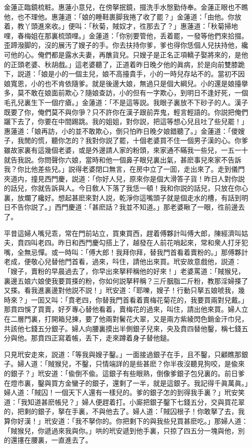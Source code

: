 金蓮正臨鏡梳粧。惠蓮小意兒，在傍拏抿鏡，掇洗手水慇勤侍奉。金蓮正眼也不瞧他，也不理他。惠蓮道：「娘的睡鞋裹脚我捲了收了罷？」金蓮道：「由他。你放着，教丫頭進來收。」便叫：「秋菊，賊奴才，徃那去了？」惠蓮道：「秋菊掃地哩，春梅姐在那裏梳頭哩。」金蓮道：「你别要管他，丢着罷，一發等他們來拾掇。歪蹄潑脚的，沒的展汚了嫂子的手。你去扶持你爹，爹也得你恁個人兒扶持他，纔可他的心。俺們都是露水夫妻，再醮貨兒。只嫂子是正名正項轎子娶將來的，是他的正頭老婆、秋胡戲。」這老婆聽了，正道着昨日晚夕他的眞病，於是向前雙膝跪下，説道：「娘是小的一個主兒，娘不高擡貴手，小的一時兒存站不的。當初不因娘寬恩，小的也不肯依隨爹。就是後邊大娘，無過只是個大綱兒。小的還是娘擡擧多，莫不敢在娘面前欺心？隨娘查訪，小的但有一字欺心，到明日不逢好死，一個毛孔兒裏生下一個疔瘡。」金蓮道：「不是這等説。我眼子裏放不下砂子的人。漢子既要了你，俺們莫不與你爭？只不許你在漢子跟前弄鬼，輕言輕語的。你説把俺們躧下去了，你要在中間踢跳。我的姐姐，對你説，把這等想心兒且吐了些兒罷！」惠蓮道：「娘再訪，小的並不敢欺心，倒只怕昨日晚夕娘錯聽了。」金蓮道：「儍嫂子，我閒的慌，聽你怎的？我對你説了罷，十個老婆買不住一個男子漢的心。你爹雖故家裏有這幾個老婆，或是外邊請人家的粉頭，來家通不瞞我一些兒，一五一十就告我説。你問聲你六娘，當時和他一個鼻子眼兒裏出氣，甚麽事兒來家不告訴我？你比他差些兒。」説得老婆閉口無言，在房中立了一囬，走出來了。走到儀門夾道内，撞見西門慶，説道：「你好人兒，原來你是個大滑答子貨！昨日人對你説的話兒，你就告訴與人。今日敎人下落了我恁一頓！我和你説的話兒，只放在你心裏，放爛了纔好。想起甚麽來對人説，乾淨你這嘴頭子就是個走水的槽，有話到明日不告你説了。」西門慶道：「甚麽話？我並不知道。」那老婆瞅了一眼，徃前邊去了。

平昔這婦人嘴兒乖，常在門前站立，買東買西，趕着傅夥計叫傅大郎，陳經濟叫姑夫，賁四叫老四。昨日和西門慶勾搭上了，越發在人前花哨起來，常和衆人打牙犯嘴，全無忌憚。或一時叫：「傅大郎！我拜你拜，替我門首看着賣粉的。」那傅夥計老成，便敬心兒替他門首看，過來，呌住，請他出來買。玳安故意戲他，説道：「嫂子，賣粉的早晨過去了，你早出來拏秤稱他的好來！」老婆罵道：「賊猴兒，裏邊五娘六娘使我要買搽的粉，你如何説拏秤稱？三斤胭脂二斤粉，教那淫婦搽了又搽。看我進裏邊對他説不説！」玳安道：「耶嚛，嫂子！行動只拏五娘唬我，幾時來？」一囬又叫：「賁老四，你替我門首看着賣梅花菊花的，我要買兩對兒戴。」那賁四悞了買賣，好歹專心替他看着，賣梅花的過來，叫住，請出他來買。婦人立在二層門裏，打開箱兒揀，要了他兩對鬢花大翠，又是兩方紫綾閃色銷金汗巾兒，共該他七錢五分銀子。婦人向腰裏摸出半側銀子兒來，央及賁四替他鑿，稱七錢五分與他。那賁四正寫着帳，丢下，走來蹲着身子替他鎚。

只見玳安走來，説道：「等我與嫂子鑿。」一面接過銀子在手，且不鑿，只顧瞧那銀子。婦人道：「賊猴兒，不鑿，只情端詳的是些甚麽？你半夜沒聽見狗咬，是偸來的銀子？」玳安道：「偸倒不偸。這銀子有些眼熟，倒像爹銀子包兒裏的。前日爹在燈市裏，鑿與買方金蠻子的銀子，還剩了一半，就是這銀子。我記得千眞萬眞。」婦人道：「賊囚！一個天下人還有一樣兒的。爹的銀子怎的到得我手裏？」玳安笑道：「我知道甚麽帳兒？」婦人便趕着打。小廝把銀子鑿下七錢五分，交與買花翠的，把剩的銀子，拏在手裏，不與他去了。婦人道：「賊囚根子！你敢拏了去，我算你好漢！」玳安道：「我不拏你的。你把剩下的與我些兒買甚麽吃。」那婦人道：「賊猴兒，你遞過來我與你。」哄的玳安遞到他手裏，只掠了四五分一塊與他，別的還㩙在腰裏，一直進去了。

